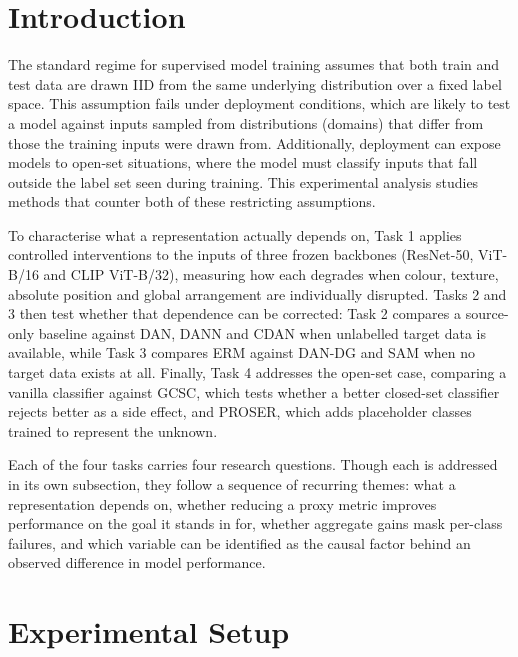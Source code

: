 \documentclass{article}
\begin{document}
\section{Introduction}
\label{sec:intro}

The standard regime for supervised model training assumes that both train and
test data are drawn IID from the same underlying distribution over a fixed
label space. This assumption fails under deployment conditions, which are
likely to test a model against inputs sampled from distributions (domains)
that differ from those the training inputs were drawn from. Additionally,
deployment can expose models to open-set situations, where the model must
classify inputs that fall outside the label set seen during training. This
experimental analysis studies methods that counter both of these restricting
assumptions.

To characterise what a representation actually depends on, Task 1 applies
controlled interventions to the inputs of three frozen backbones (ResNet-50,
ViT-B/16 and CLIP ViT-B/32), measuring how each degrades when colour,
texture, absolute position and global arrangement are individually disrupted.
Tasks 2 and 3 then test whether that dependence can be corrected: Task 2
compares a source-only baseline against DAN, DANN and CDAN when unlabelled
target data is available, while Task 3 compares ERM against DAN-DG and SAM
when no target data exists at all. Finally, Task 4 addresses the open-set
case, comparing a vanilla classifier against GCSC, which tests whether a
better closed-set classifier rejects better as a side effect, and PROSER,
which adds placeholder classes trained to represent the unknown.

Each of the four tasks carries four research questions. Though each is
addressed in its own subsection, they follow a sequence of recurring themes:
what a representation depends on, whether reducing a proxy metric improves
performance on the goal it stands in for, whether aggregate gains mask
per-class failures, and which variable can be identified as the causal factor
behind an observed difference in model performance.

\section{Experimental Setup}
\label{sec:setup}
\end{document}
